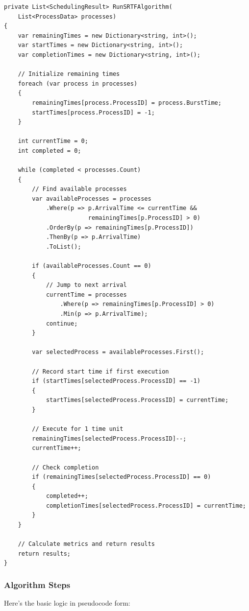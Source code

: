 \documentclass[12pt,letterpaper]{article}
\begin{document}
\begin{lstlisting}[caption={SRTF Implementation}]
private List<SchedulingResult> RunSRTFAlgorithm(
    List<ProcessData> processes)
{
    var remainingTimes = new Dictionary<string, int>();
    var startTimes = new Dictionary<string, int>();
    var completionTimes = new Dictionary<string, int>();
    
    // Initialize remaining times
    foreach (var process in processes)
    {
        remainingTimes[process.ProcessID] = process.BurstTime;
        startTimes[process.ProcessID] = -1;
    }
    
    int currentTime = 0;
    int completed = 0;
    
    while (completed < processes.Count)
    {
        // Find available processes
        var availableProcesses = processes
            .Where(p => p.ArrivalTime <= currentTime &&
                        remainingTimes[p.ProcessID] > 0)
            .OrderBy(p => remainingTimes[p.ProcessID])
            .ThenBy(p => p.ArrivalTime)
            .ToList();
        
        if (availableProcesses.Count == 0)
        {
            // Jump to next arrival
            currentTime = processes
                .Where(p => remainingTimes[p.ProcessID] > 0)
                .Min(p => p.ArrivalTime);
            continue;
        }
        
        var selectedProcess = availableProcesses.First();
        
        // Record start time if first execution
        if (startTimes[selectedProcess.ProcessID] == -1)
        {
            startTimes[selectedProcess.ProcessID] = currentTime;
        }
        
        // Execute for 1 time unit
        remainingTimes[selectedProcess.ProcessID]--;
        currentTime++;
        
        // Check completion
        if (remainingTimes[selectedProcess.ProcessID] == 0)
        {
            completed++;
            completionTimes[selectedProcess.ProcessID] = currentTime;
        }
    }
    
    // Calculate metrics and return results
    return results;
}
\end{lstlisting}

\subsubsection{Algorithm Steps}

Here's the basic logic in pseudocode form:
\end{document}
